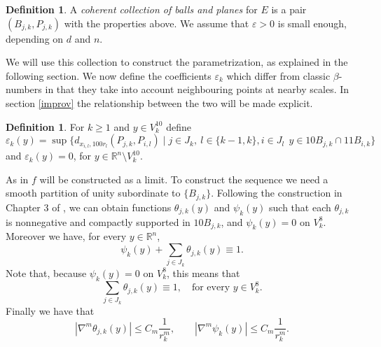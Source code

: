 \documentclass[11pt, twoside, leqno]{article}
\numberwithin{equation}{section}
\theoremstyle{plain}
\theoremstyle{definition}
\newtheorem{defin}[thm]{Definition}
\newcommand{\R}{\mathbb{R}}
\newcommand{\e}{\varepsilon} %
\begin{document}
\begin{defin} \label{defccbp}
A \emph{coherent collection of balls and planes} for $E$ is a pair $(B_{j,k},P_{j,k})$ with the properties above. We assume that $\e>0$ is small enough, depending on $d$ and $n$.
\end{defin}

We will use this collection to construct the parametrization, as explained in the following section. 
We now define the coefficients $\e_k$ which differ from classic $\beta$-numbers in that they take into account neighbouring points at nearby scales. In section \ref{improv} the relationship between the two will be made explicit.
\begin{defin} \label{e_k}
For $k \geq 1$ and $y \in V^{10}_k$ define
\begin{equation}
 \e_k(y)=\sup\{ d_{x_{i,l},100r_l}(P_{j,k},P_{i,l}) \mid j \in J_k, \ l \in \{k-1,k\}, i \in J_l \  \ y \in 10B_{j,k} \cap11B_{i,k}\}
\end{equation}
and $ \e_k(y)=0$, for $y \in \R^n \setminus V_k^{10}$.
\end{defin}

As in \cite{davidtoro} $f$ will be constructed as a limit. To construct the sequence we need a smooth partition of unity subordinate to $\{B_{j,k}\}$.
Following the construction in Chapter 3 of \cite{davidtoro}, we can obtain functions $\theta_{j,k}(y)$ and $\psi_k(y)$ such that each $\theta_{j,k}$ is nonnegative and compactly supported in $10B_{j,k}$, and $\psi_k(y)=0$ on $V_k^8$. Moreover we have, for every $y \in \R^n$,
\begin{equation} 
\psi_k(y) + \sum_{j \in J_k} \theta_{j,k}(y)\equiv 1.
\end{equation}
Note that, because $\psi_k(y)=0$ on $V_k^8$, this means that 
\begin{equation} \label{partition}
\sum_{j \in J_k} \theta_{j,k}(y)\equiv 1, \quad \text{for every $y \in V_k^8$}.
\end{equation}
Finally we have that
\begin{equation}
|\nabla^m\theta_{j,k}(y)| \leq C_m\frac{1}{r_k^m},  \qquad |\nabla^m\psi_k(y)| \leq C_m\frac{1}{r_k^m}.
\end{equation}
 
\end{document}
